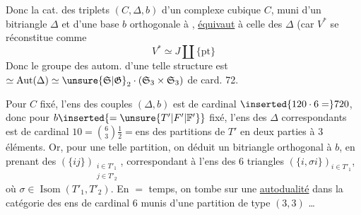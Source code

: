 Donc la cat. des triplets $(C,\Delta,b)$ d'un complexe cubique $C$, muni d'un bitriangle $\Delta$ et d'une base $b$ orthogonale à , \uline{équivaut} à celle des $\Delta$ (car $V^*$ se réconstitue comme
\[
V^*\simeq J\amalg\{\mathrm{pt}\}
\]
Donc le groupe des autom. d'une telle structure est $\simeq\operatorname{Aut}(\Delta)\simeq\unsure{\mathfrak S|\mathfrak G}_2\cdot(\mathfrak S_3\times\mathfrak S_3)$ de card. 72.

Pour $C$ fixé, l'ens des couples $(\Delta,b)$ est de cardinal $\inserted{120\cdot6=}720$, donc pour $b\inserted{=\unsure{T'|F'|\mathbb F'}}$ fixé, l'ens des $\Delta$ correspondants est de cardinal $10=\binom63\frac12={}$ens des partitions  de $T'$ en deux parties à 3 éléments. Or, pour une telle partition, on déduit un bitriangle orthogonal à $b$, en prenant  des $(\{ij\})_{\substack{i\in T'_1\\j\in T'_2}}$, correspondant à l'ens  des 6 triangles $(\{i,\sigma i\})_{i\in T'_1}$, où $\sigma\in\operatorname{Isom}(T'_1,T'_2)$.
 En $=$ temps, on tombe sur une \uline{autodualité} dans la catégorie des ens de cardinal 6 munis d'une partition de type $(3,3)$ \ldots
